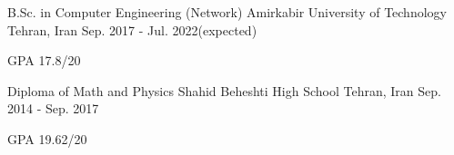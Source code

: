 

\begin{cventries}

  \cventry    
    {B.Sc. in Computer Engineering (Network)} %
    {Amirkabir University of Technology} %
    {Tehran, Iran} %
    {Sep. 2017 - Jul. 2022(expected)} %
    {
      \begin{cvitems} %
        \item {GPA 17.8/20}
      \end{cvitems}
    }
  \cventry
    {Diploma of Math and Physics} %
    {Shahid Beheshti High School} %
    {Tehran, Iran} %
    {Sep. 2014 - Sep. 2017} %
    {
      \begin{cvitems} %
        \item {GPA 19.62/20}
      \end{cvitems}
    }
\end{cventries}
